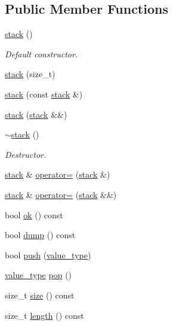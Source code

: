 \subsection*{Public Member Functions}
\begin{DoxyCompactItemize}
\item 
\mbox{\label{classstack_a65efc6bf4210228326d0a6a2813fd406}} 
\hyperlink{classstack_a65efc6bf4210228326d0a6a2813fd406}{stack} ()
\begin{DoxyCompactList}\small\item\em Default constructor. \end{DoxyCompactList}\item 
\hyperlink{classstack_ad1417df58803f247fa6437631a1beeef}{stack} (size\+\_\+t)
\item 
\hyperlink{classstack_a6664e76c4bdc9b907e41e458d4324603}{stack} (const \hyperlink{classstack}{stack} \&)
\item 
\hyperlink{classstack_a62a3ddd238e62abed272e4557509fd23}{stack} (\hyperlink{classstack}{stack} \&\&)
\item 
\mbox{\label{classstack_ae20e5d415f840f36862007e95a1dcbe7}} 
\hyperlink{classstack_ae20e5d415f840f36862007e95a1dcbe7}{$\sim$stack} ()
\begin{DoxyCompactList}\small\item\em Destructor. \end{DoxyCompactList}\item 
\hyperlink{classstack}{stack} \& \hyperlink{classstack_a405cb40f99da46e1ae97076c544866fb}{operator=} (\hyperlink{classstack}{stack} \&)
\item 
\hyperlink{classstack}{stack} \& \hyperlink{classstack_a413ffacb608eaa8b838bfbe078c7b554}{operator=} (\hyperlink{classstack}{stack} \&\&)
\item 
bool \hyperlink{classstack_a12bb4c544eb6cc7ca43cab1a8616d3db}{ok} () const
\item 
bool \hyperlink{classstack_a8a37d01fe5845ebf19d1f30921b93a51}{dump} () const
\item 
bool \hyperlink{classstack_a3d026ffa5b32a0a43d7432e8b0eecfed}{push} (\hyperlink{classstack_acb2e70c8f4214e9446e9f69f69da8b94}{value\+\_\+type})
\item 
\hyperlink{classstack_acb2e70c8f4214e9446e9f69f69da8b94}{value\+\_\+type} \hyperlink{classstack_a88f5bbf41acc7d70bbe1dc54ea7097a5}{pop} ()
\item 
size\+\_\+t \hyperlink{classstack_af92cacb24391bd58fc48788afbd375b7}{size} () const
\item 
size\+\_\+t \hyperlink{classstack_ad6340374ef03a5259458b8f24351b61f}{length} () const
\end{DoxyCompactItemize}


